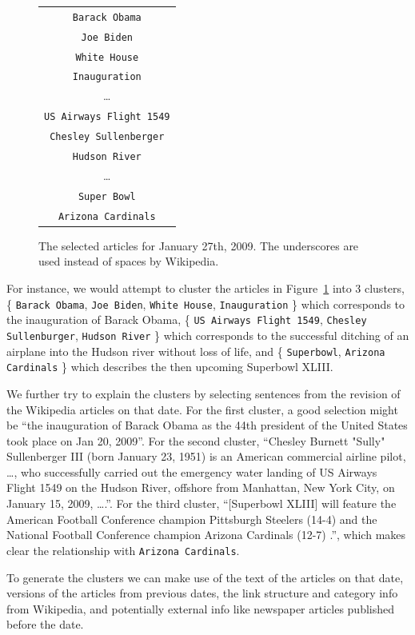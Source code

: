 \documentclass[11pt]{article}
\newcommand{\war}[1]{{\tt\small #1}}
\begin{document}
\begin{figure}
\centering
\begin{tabular}{|c|}
\hline
\war{Barack Obama} \\
\war{Joe Biden} \\
\war{White House} \\
\war{Inauguration} \\
\dots \\
\war{US Airways Flight 1549} \\
\war{Chesley Sullenberger} \\
\war{Hudson River} \\
\dots \\
\war{Super Bowl} \\
\war{Arizona Cardinals} \\
\hline
\end{tabular}
\caption{The selected articles for January 27th, 2009. The underscores are used instead of spaces by Wikipedia.}
\label{fig:topics-jan-27}
\end{figure}

For instance, we would attempt to cluster the articles in Figure~\ref{fig:topics-jan-27} into 3 clusters, \{ \war{Barack Obama}, \war{Joe Biden}, \war{White House}, \war{Inauguration} \} which corresponds to the inauguration of Barack Obama, \{ \war{US Airways Flight 1549}, \war{Chesley Sullenburger}, \war{Hudson River} \} which corresponds to the successful ditching of an airplane into the Hudson river without loss of life, and \{ \war{Superbowl}, \war{Arizona Cardinals} \} which describes the then upcoming Superbowl XLIII.

We further try to explain the clusters by selecting sentences from the revision of the Wikipedia articles on that date. For the first cluster, a good selection might be ``the inauguration of Barack Obama as the 44th president of the United States took place on Jan 20, 2009''. For the second cluster, ``Chesley Burnett "Sully" Sullenberger III (born January 23, 1951)  is an American commercial airline pilot, \ldots, who successfully carried out the emergency water landing of US Airways Flight 1549 on the Hudson River, offshore from Manhattan, New York City, on January 15, 2009, \ldots.''. For the third cluster, ``[Superbowl XLIII] will feature the American Football Conference champion Pittsburgh Steelers (14-4) and the National Football Conference champion Arizona Cardinals (12-7) .'', which makes clear the relationship with \war{Arizona Cardinals}.

To generate the clusters we can make use of the text of the articles on that date, versions of the articles from previous dates, the link structure and category info from Wikipedia, and potentially external info like newspaper articles published before the date.
\end{document}
